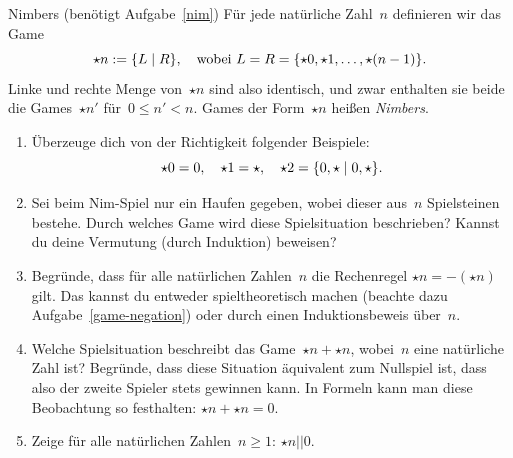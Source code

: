 \documentclass{../zirkelblatt}
\newcommand{\fuzzy}{\mathrel{||}}
\begin{document}
\begin{aufgabe}{Nimbers (benötigt Aufgabe~\ref{nim})}
\label{nimbers}
Für jede natürliche Zahl~$n$ definieren wir das Game
\[ \star n := \{ L \mathrel{|} R \}, \quad
\text{wobei~$L = R = \{ \star 0, \star 1, \ldots, \star(n-1) \}$.} \]
Linke und rechte Menge von~$\star n$ sind also identisch, und zwar enthalten
sie beide die Games~$\star n'$ für~$0 \leq n' < n$. Games der Form~$\star n$
heißen \emph{Nimbers}.
\begin{enumerate}
\item Überzeuge dich von der Richtigkeit folgender Beispiele:
\[ \star 0 = 0, \quad
  \star 1 = \star, \quad
  \star 2 = \{ 0,\star \mathrel{|} 0,\star \}. \]
\item Sei beim Nim-Spiel nur ein Haufen gegeben, wobei dieser aus~$n$
Spielsteinen bestehe. Durch welches Game wird diese Spielsituation beschrieben?
Kannst du deine Vermutung (durch Induktion) beweisen?
\item Begründe, dass für alle natürlichen Zahlen~$n$ die Rechenregel
$\star n = -(\star n)$
gilt. Das kannst du entweder spieltheoretisch machen (beachte dazu
Aufgabe~\ref{game-negation}) oder durch einen Induktionsbeweis über~$n$.
\item Welche Spielsituation beschreibt das Game~$\star n + \star n$, wobei~$n$
eine natürliche Zahl ist? Begründe, dass diese Situation äquivalent zum
Nullspiel ist, dass also der zweite Spieler stets gewinnen kann. In Formeln
kann man diese Beobachtung so festhalten: $\star n + \star n = 0.$
\item Zeige für alle natürlichen Zahlen~$n \geq 1$: $\star n \fuzzy 0$.
\end{enumerate}
\end{aufgabe}
\end{document}
